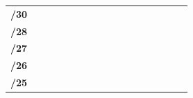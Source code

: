 \documentclass[11pt,a4paper]{report}
\begin{document}
\begin{longtable}[c]{rcccccccccccccccc}
            \textbf{/30}                                                                               &                               &                                &                                &                               &                                &                               &                                &                               & \cellcolor[HTML]{C09FE5}    & \cellcolor[HTML]{C09FE5}    &                             &                             &                             &                             &                             &                             \\
            \textbf{/28}                                                                               &                               &                                &                                &                               &                                &                               & \cellcolor[HTML]{BFBFBF}       & \cellcolor[HTML]{BFBFBF}      &                             &                             &                             &                             &                             &                             &                             &                             \\
            \textbf{/27}                                                                               &                               &                                &                                &                               & \cellcolor[HTML]{FFD966}       & \cellcolor[HTML]{FFD966}      &                                &                               &                             &                             &                             &                             &                             &                             &                             &                             \\
            \textbf{/26}                                                                               &                               &                                & \cellcolor[HTML]{A9D08E}       & \cellcolor[HTML]{A9D08E}      &                                &                               &                                &                               &                             &                             &                             &                             &                             &                             &                             &                             \\
            \textbf{/25}                                                                               & \cellcolor[HTML]{F4B084}      & \cellcolor[HTML]{F4B084}       &                                &                               &                                &                               &                                &                               &                             &                             &                             &                             &                             &                             &                             &                             \\ \hline

\end{longtable}
\end{document}
